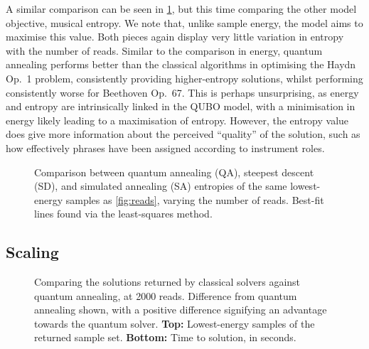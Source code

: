 \documentclass[12pt]{article}
\theoremstyle{definition}
\begin{document}
A similar comparison can be seen in \cref{fig:entropy}, but this time comparing the other model objective, musical entropy. We note that, unlike sample energy, the model aims to maximise this value. Both pieces again display very little variation in entropy with the number of reads. Similar to the comparison in energy, quantum annealing performs better than the classical algorithms in optimising the Haydn Op.\ 1 problem, consistently providing higher-entropy solutions, whilst performing consistently worse for Beethoven Op.\ 67. This is perhaps unsurprising, as energy and entropy are intrinsically linked in the QUBO model, with a minimisation in energy likely leading to a maximisation of entropy. However, the entropy value does give more information about the perceived ``quality'' of the solution, such as how effectively phrases have been assigned according to instrument roles.

\begin{figure}[ht]
    \centering\footnotesize
    
    \caption{Comparison between quantum annealing (QA), steepest descent (SD), and simulated annealing (SA) entropies of the same lowest-energy samples as \cref{fig:reads}, varying the number of reads. Best-fit lines found via the least-squares method.}
    \label{fig:entropy}
\end{figure}

\subsection{Scaling}

\begin{figure}[ht]
    \centering\footnotesize
    
    \caption{Comparing the solutions returned by classical solvers against quantum annealing, at \num{2000} reads. Difference from quantum annealing shown, with a positive difference signifying an advantage towards the quantum solver. \textbf{Top:} Lowest-energy samples of the returned sample set. \textbf{Bottom:} Time to solution, in seconds.}
    \label{fig:scaling}
\end{figure}
\end{document}
